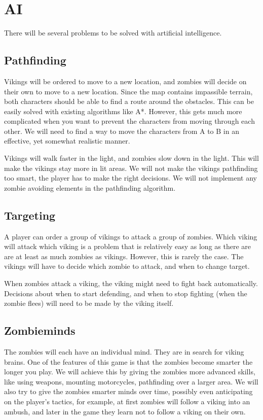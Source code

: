 \chapter{AI}

There will be several problems to be solved with artificial intelligence.

\section{Pathfinding}

Vikings will be ordered to move to a new location, and zombies will decide on their own to move to a new location. Since the map contains impassible terrain, both characters should be able to find a route around the obstacles. This can be easily solved with existing algorithms like A*. However, this gets much more complicated when you want to prevent the characters from moving through each other. We will need to find a way to move the characters from A to B in an effective, yet somewhat realistic manner.

Vikings will walk faster in the light, and zombies slow down in the light. This will make the vikings stay more in lit areas. We will not make the vikings pathfinding too smart, the player has to make the right decisions. We will not implement any zombie avoiding elements in the pathfinding algorithm.

\section{Targeting}

A player can order a group of vikings to attack a group of zombies. Which viking will attack which viking is a problem that is relatively easy as long as there are are at least as much zombies as vikings. However, this is rarely the case. The vikings will have to decide which zombie to attack, and when to change target.

When zombies attack a viking, the viking might need to fight back automatically. Decisions about when to start defending, and when to stop fighting (when the zombie flees) will need to be made by the viking itself.

\section{Zombieminds}

The zombies will each have an individual mind. They are in search for viking brains. One of the features of this game is that the zombies become smarter the longer you play. We will achieve this by giving the zombies more advanced skills, like using weapons, mounting motorcycles, pathfinding over a larger area. We will also try to give the zombies smarter minds over time, possibly even anticipating on the player's tactics, for example, at first zombies will follow a viking into an ambush, and later in the game they learn not to follow a viking on their own.